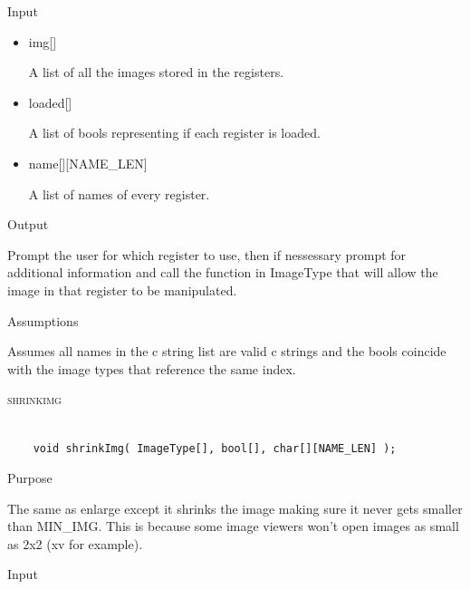 \documentclass[pdftex, 11pt]{article}
\begin{document}
\begin{description}
\begin{description}
			\item{Input}

				\begin{itemize}

					\item{img[]}

						A list of all the images stored in the registers.

					\item{loaded[]}

						A list of bools representing if each register is loaded.

					\item{name[][NAME\_LEN]}

						A list of names of every register.

				\end{itemize}

			\item{Output}

				Prompt the user for which register to use, then if nessessary
				prompt for additional information and call the function
				in ImageType that will allow the image in that register to
				be manipulated.

			\item{Assumptions}

				Assumes all names in the c string list are valid c
				strings and the bools coincide with the image types that
				reference the same index.

		\end{description}



	\item{\textsc{shrinkimg}}

		\begin{lstlisting}

	void shrinkImg( ImageType[], bool[], char[][NAME_LEN] );
		\end{lstlisting}

		\begin{description}
			\item{Purpose}

				The same as enlarge except it shrinks the image making sure it never gets
				smaller than MIN\_IMG.  This is because some image viewers won't open images
				as small as 2x2 (xv for example).

			\item{Input}

				\begin{itemize}


\end{itemize}
\end{description}
\end{description}
\end{document}
